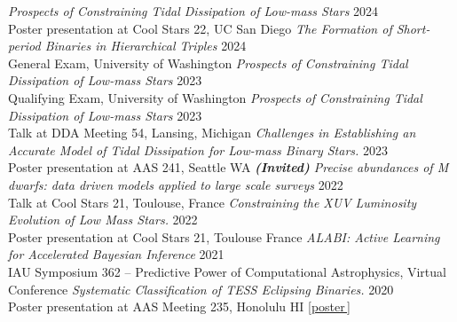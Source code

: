 \documentclass[a4,11pt]{article}
\let\orighref\href
\renewcommand{\href}[2]{\orighref{#1}{#2\,\scriptsize\faExternalLink}}
\begin{document}
\textit{Prospects of Constraining Tidal Dissipation of Low-mass Stars} \hfill 2024 \\
Poster presentation at Cool Stars 22, UC San Diego  \vspace{.2cm} \newline
\textit{The Formation of Short-period Binaries in Hierarchical Triples} \hfill 2024 \\
General Exam, University of Washington  \vspace{.2cm} \newline
\textit{Prospects of Constraining Tidal Dissipation of Low-mass Stars} \hfill 2023 \\
Qualifying Exam, University of Washington  \vspace{.2cm} \newline
\textit{Prospects of Constraining Tidal Dissipation of Low-mass Stars} \hfill 2023 \\
Talk at DDA Meeting 54, Lansing, Michigan  \vspace{.2cm} \newline
\textsl{Challenges in Establishing an Accurate Model of Tidal Dissipation for Low-mass Binary Stars.} \hfill 2023 \\ Poster presentation at AAS 241, Seattle WA  \vspace{.2cm} \newline
\textit{\textbf{(Invited)} Precise abundances of M dwarfs: data driven models applied to large scale surveys} \hfill 2022 \\
Talk at Cool Stars 21, Toulouse, France  \vspace{.2cm} \newline
\textsl{Constraining the XUV Luminosity Evolution of Low Mass Stars.} \hfill 2022 \\
Poster presentation at Cool Stars 21, Toulouse France \vspace{.2cm} \newline
\textit{ALABI: Active Learning for Accelerated Bayesian Inference} \hfill 2021 \\
IAU Symposium 362 -- Predictive Power of Computational Astrophysics, Virtual Conference \vspace{.2cm} \newline
\textsl{Systematic Classification of TESS Eclipsing Binaries.} \hfill 2020 \\
Poster presentation at AAS Meeting 235, Honolulu HI [\href{https://doi.org/10.5281/zenodo.3605647}{poster}] \vspace{.2cm} \newline
\end{document}
